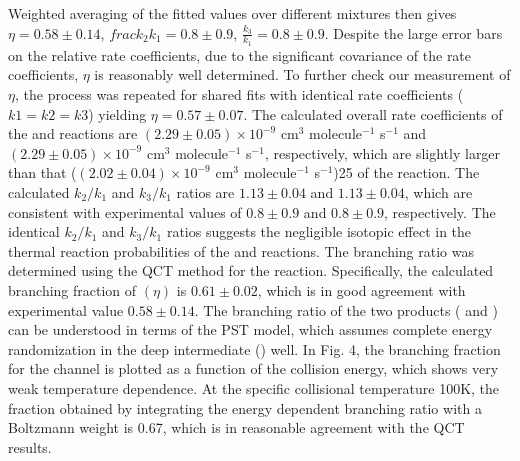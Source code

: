 Weighted averaging of the fitted values over different mixtures then gives $\eta = 0.58 \pm 0.14$, $frac{k_2}{k_1} = 0.8 \pm 0.9$, $\frac{k_3}{k_1} = 0.8 \pm 0.9$. Despite the large error bars on the relative rate coefficients, due to the significant covariance of the rate coefficients, $\eta$ is reasonably well determined. To further check our measurement of $\eta$, the process was repeated for shared fits with identical rate coefficients ($k1 = k2 = k3$) yielding $\eta = 0.57 \pm 0.07$. The calculated overall rate coefficients of the  and  reactions are $(2.29 \pm 0.05) \times 10^{-9}$ cm$^3$ molecule$^{-1}$ s$^{-1}$ and $(2.29 \pm 0.05) \times 10^{-9}$ cm$^3$ molecule$^{-1}$ s$^{-1}$, respectively, which are slightly larger than that ($(2.02 \pm 0.04) \times 10^{-9}$ cm$^3$ molecule$^{-1}$ s$^{-1}$)25 of the  reaction. The calculated $k_2/k_1$ and $k_3/k_1$ ratios are $1.13 \pm 0.04$ and $1.13 \pm 0.04$, which are consistent with experimental values of $0.8 \pm 0.9$ and $0.8 \pm 0.9$, respectively. The identical $k_2/k_1$ and $k_3/k_1$ ratios suggests the negligible isotopic effect in the thermal reaction probabilities of the  and  reactions. The branching ratio was determined using the QCT method for the  reaction. Specifically, the calculated branching fraction of  $(\eta)$ is $0.61 \pm 0.02$, which is in good agreement with experimental value $0.58 \pm 0.14$. The branching ratio of the two products ( and ) can be understood in terms of the PST model, which assumes complete energy randomization in the deep intermediate () well. In Fig. 4, the branching fraction for the  channel is plotted as a function of the collision energy, which shows very weak temperature dependence. At the specific collisional temperature 100K, the fraction obtained by integrating the energy dependent branching ratio with a Boltzmann weight is 0.67, which is in reasonable agreement with the QCT results.

